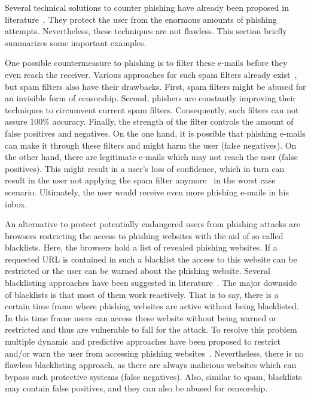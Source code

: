 Several technical solutions to counter phishing have already been proposed in literature~\cite{purkait2012phishing}. 
They protect the user from the enormous amounts of phishing attempts. Nevertheless, these techniques are not flawless. 
This section briefly summarizes some important examples.

\begin{description}[leftmargin=0cm]
	\item[Spam filters:] One possible countermeasure to phishing is to filter these e-mails before they even reach the receiver.
 Various approaches for such spam filters already exist~\cite{bergholz2010new,chandrasekaran2006phishing,fette2007learning}, but spam filters also have their drawbacks.
 First, spam filters might be abused for an invisible form of censorship.
 Second, phishers are constantly improving their techniques to circumvent current spam filters.
 Consequently, such filters can not assure 100\% accuracy.
 Finally, the strength of the filter controls the amount of false positives and negatives.
 On the one hand, it is possible that phishing e-mails can make it through these filters and might harm the user (false negatives). 
On the other hand, there are legitimate e-mails which may not reach the user (false positives). 
This might result in a user's loss of confidence, which in turn can result in the user not applying the spam filter anymore~\cite{olivo2011obtaining} in the worst case scenario. Ultimately, the user would receive even more phishing e-mails in his inbox.
	\item[URL Blacklists:] An alternative to protect potentially endangered users from phishing attacks are browsers restricting the access to phishing websites with the aid of so called blacklists.
 Here, the browsers hold a list of revealed phishing websites.
 If a requested URL is contained in such a blacklist the access to this website can be restricted or the user can be warned about the phishing website.
 Several blacklisting approaches have been suggested in literature~\cite{ma2009beyond, zhang2008highly}. The major downside of blacklists is that most of them work reactively.
 That is to say, there is a certain time frame where phishing websites are active without being blacklisted.
 In this time frame users can access these website without being warned or restricted and thus are vulnerable to fall for the attack.
 To resolve this problem multiple dynamic and predictive approaches have been proposed to restrict and/or warn the user from accessing phishing websites~\cite{prakash2010phishnet, obied2009fraudulent, balzarotti2012proactive}. Nevertheless, there is no flawless blacklisting approach, as there are always malicious websites which can bypass such protective systems (false negatives). Also, similar to spam, blacklists may contain false positives, and they can also be abused for censorship.

\end{description}
